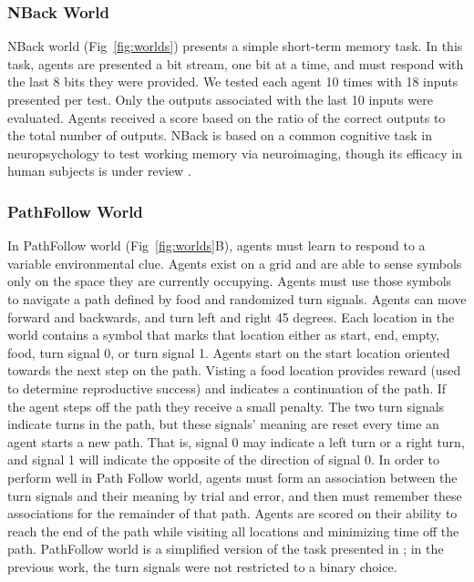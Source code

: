 
\subsubsection{NBack World}
NBack world (Fig~\ref{fig:worlds}) presents a simple short-term memory task. 
In this task, agents are presented a bit stream, one bit at a time, and must respond with the last 8 bits they were provided. 
We tested each agent 10 times with 18 inputs presented per test. 
Only the outputs associated with the last 10 inputs were evaluated. 
Agents received a score based on the ratio of the correct outputs to the total number of outputs.
NBack is based on a common cognitive task in neuropsychology to test working memory via neuroimaging, though its efficacy in human subjects is under review \citep{owen_n-back_2005, miller_is_2009, jaeggi_concurrent_2010}.

\subsubsection{PathFollow World}
In PathFollow world (Fig~\ref{fig:worlds}B), agents must learn to respond to a variable environmental clue. 
Agents exist on a grid and are able to sense symbols only on the space they are currently occupying. 
Agents must use those symbols to navigate a path defined by food and randomized turn signals. 
Agents can move forward and backwards, and turn left and right 45 degrees. 
Each location in the world contains a symbol that marks that location either as start, end, empty, food, turn signal 0, or turn signal 1. 
Agents start on the start location oriented towards the next step on the path. 
Visting a food location provides reward (used to determine reproductive success) and indicates a continuation of the path. 
If the agent steps off the path they receive a small penalty. 
The two turn signals indicate turns in the path, but these signals' meaning are reset every time an agent starts a new path. 
That is, signal 0 may indicate a left turn or a right turn, and signal 1 will indicate the opposite of the direction of signal 0. 
In order to perform well in Path Follow world, agents must form an association between the turn signals and their meaning by trial and error, and then must remember these associations for the remainder of that path.
Agents are scored on their ability to reach the end of the path while visiting all locations and minimizing time off the path.
PathFollow world is a simplified version of the task presented in \cite{pontes_evolutionary_2020}; in the previous work, the turn signals were not restricted to a binary choice.

